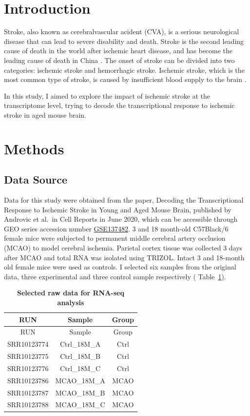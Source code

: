 \documentclass[
  a4paper,
]{article}
\begin{document}
\hypertarget{introduction}{%
\section{Introduction}\label{introduction}}

Stroke, also known as cerebralvascular acident (CVA), is a serious
neurological disease that can lead to severe disability and death.
Stroke is the second leading cause of death in the world after ischemic
heart disease, and has become the leading cause of death in China
\cite{Liping2011Stroke}. The onset of stroke can be divided into two
categories: ischemic stroke and hemorrhagic stroke. Ischemic stroke,
which is the most common type of stroke, is caused by insufficient blood
supply to the brain \cite{2015Endovascular}.

In this study, I aimed to explore the impact of ischemic stroke at the
transcriptome level, trying to decode the transcriptional response to
ischemic stroke in aged mouse brain.

\hypertarget{methods}{%
\section{Methods}\label{methods}}

\hypertarget{data-source}{%
\subsection{Data Source}\label{data-source}}

Data for this study were obtained from the paper, Decoding the
Transcriptional Response to Ischemic Stroke in Young and Aged Mouse
Brain, published by Androvic et al.~in Cell Reports in June 2020, which
can be accessible through GEO series accession number
\href{https://www.ncbi.nlm.nih.gov/geo/query/acc.cgi?acc=GSE137482}{GSE137482}.
3 and 18 month-old C57Black/6 female mice were subjected to permanent
middle cerebral artery occlusion (MCAO) to model cerebral ischemia.
Parietal cortex tissue was collected 3 days after MCAO and total RNA was
isolated using TRIZOL. Intact 3 and 18-month old female mice were used
as controls. I selected six samples from the original data, three
experimental and three control sample respectively (
Table~\ref{tbl-samples}).

\hypertarget{tbl-samples}{}
\begin{longtable}[]{@{}ccc@{}}
\caption{\label{tbl-samples}\textbf{Selected raw data for RNA-seq
analysis}}\tabularnewline
\toprule()
RUN & Sample & Group \\
\midrule()
\endfirsthead
\toprule()
RUN & Sample & Group \\
\midrule()
\endhead
SRR10123774 & Ctrl\_18M\_A & Ctrl \\
SRR10123775 & Ctrl\_18M\_B & Ctrl \\
SRR10123776 & Ctrl\_18M\_C & Ctrl \\
SRR10123786 & MCAO\_18M\_A & MCAO \\
SRR10123787 & MCAO\_18M\_B & MCAO \\
SRR10123788 & MCAO\_18M\_C & MCAO \\
\bottomrule()
\end{longtable}
\end{document}
